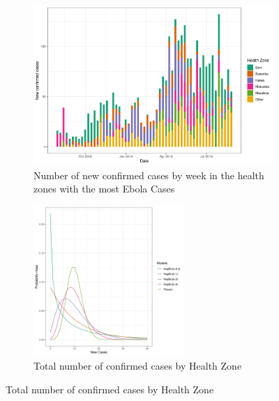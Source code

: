 \documentclass[12pt]{article}
\begin{document}
\begin{figure}[h]
\begin{subfigure}{0.48\textwidth}
  \centering

  \includegraphics[width=\textwidth]{../output/epi_curve.png}
  \caption{Number of new confirmed cases by week in the health zones with the most Ebola Cases}
  \label{fig:epi_curve}
\end{subfigure}
\begin{subfigure}{0.48\textwidth}
  \centering
  \includegraphics[height=5.7cm]{../output/tot_map.png}
  \caption{Total number of confirmed cases by Health Zone}
  \label{fig:tot_map}
\end{subfigure}


\end{figure}
\end{document}
